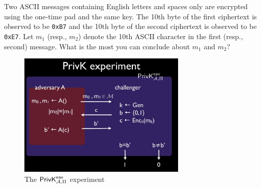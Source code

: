 \documentclass[a4paper,10pt,landscape,twocolumn]{scrartcl}
\begin{document}
\problems

%


\begin{exercise}
Two ASCII messages containing English letters and spaces only are encrypted using the one-time pad and the same key. The 10th byte of the first ciphertext is observed to be \texttt{0xB7} and the 10th byte of the second ciphertext is observed to be \texttt{0xE7}. Let $m_1$ (resp., $m_2$) denote the 10th ASCII character in the first (resp., second) message. What is the most you can conclude about $m_1$ and $m_2$?
\end{exercise}

\begin{figure}[h]
\center
\includegraphics[width=8cm]{PrivKexperiment.jpg}
\caption{The $\mathsf{PrivK}^{\mathsf{eav}}_{\mathcal{A},\Pi}$ experiment \label{fig}}
\end{figure}
\end{document}
